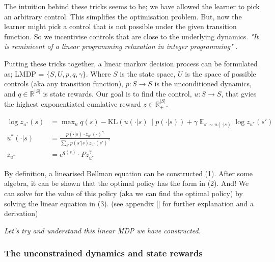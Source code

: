 The intuition behind these tricks seems to be; we have allowed the learner to pick an arbitrary control.
This simplifies the optimisation problem. But, now the learner might pick a control that is not possible
under the given transition function. So we incentivise controls that are close to the underlying dynamics.
\textit{"It is reminicent of a linear programming relaxation in integer programming"} \cite{Todorov}.



Putting these tricks together, a linear markov decision process can be formulated as;
LMDP = $\{S, U, p, q, \gamma\}$. Where $S$ is the state space, $U$ is the space of possible controls (aka any transition function),
$p: S \to S$ is the unconditioned dynamics, and $q \in \mathbb R^{|S|}$ is state rewards.
Our goal is to find the control, $u: S \to S$, that gvies the highest exponentiated cumlative reward $z \in \mathbb R_+^{|S|}$.

\begin{align}
\log z_{u^{* }}(s) &= \mathop{\text{max}}_{u} q(s) - \text{KL}(u(\cdot| s) \parallel p(\cdot | s)) + \gamma \mathop{\mathbb E}_{s' \sim u(\cdot | s)} \log z_{u^{* }}(s') \tag{1}\\
u^{* }(\cdot | s) &= \frac{p(\cdot | s)\cdot z_{u^{* }}(\cdot)^{\gamma}}{\sum_{s'} p(s' | s) z_{u^{* }}(s')^{\gamma}} \tag{2}\\
z_{u^{* }} &= e^{q(s)}\cdot P z_{u^{* }}^{\gamma} \tag{3}
\end{align}

By definition, a linearised Bellman equation can be constructed (1). After some algebra,
it can be shown that the optimal policy has the form in (2).
And! We can solve for the value of this policy (aka we can find the optimal policy)
by solving the linear equation in (3). (see appendix [] for further explanation and a derivation)

\begin{displayquote}
\textit{Let's try and understand this linear MDP we have constructed.}
\end{displayquote}

\subsubsection{\color{red}The unconstrained dynamics and state rewards}

